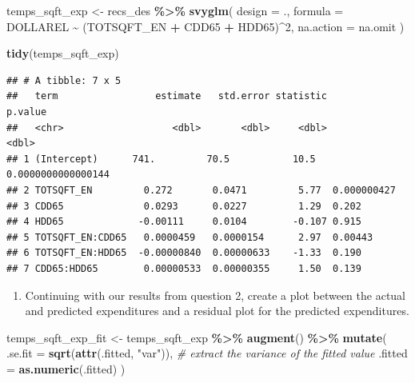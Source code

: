 \documentclass[
]{krantz}
\makeatletter
\newenvironment{Shaded}{\begin{snugshade}}{\end{snugshade}}
\newcommand{\AttributeTok}[1]{\textcolor[rgb]{0.27,0.27,0.27}{#1}}
\newcommand{\CommentTok}[1]{\textcolor[rgb]{0.37,0.37,0.37}{\textit{#1}}}
\newcommand{\DecValTok}[1]{\textcolor[rgb]{0.06,0.06,0.06}{#1}}
\newcommand{\FunctionTok}[1]{\textcolor[rgb]{0.27,0.27,0.27}{\textbf{#1}}}
\newcommand{\NormalTok}[1]{#1}
\newcommand{\OtherTok}[1]{\textcolor[rgb]{0.37,0.37,0.37}{#1}}
\newcommand{\SpecialCharTok}[1]{\textcolor[rgb]{0.43,0.43,0.43}{\textbf{#1}}}
\newcommand{\StringTok}[1]{\textcolor[rgb]{0.5,0.5,0.5}{#1}}
\providecommand{\tightlist}{%
  \setlength{\itemsep}{0pt}\setlength{\parskip}{0pt}}
\newenvironment{kframe}{%
\medskip{}
\setlength{\fboxsep}{.8em}
 \def\at@end@of@kframe{}%
 \ifinner\ifhmode%
  \def\at@end@of@kframe{\end{minipage}}%
  \begin{minipage}{\columnwidth}%
 \fi\fi%
 \def\FrameCommand##1{\hskip\@totalleftmargin \hskip-\fboxsep
 \colorbox{shadecolor}{##1}\hskip-\fboxsep
     \hskip-\linewidth \hskip-\@totalleftmargin \hskip\columnwidth}%
 \MakeFramed {\advance\hsize-\width
   \@totalleftmargin\z@ \linewidth\hsize
   \@setminipage}}%
 {\par\unskip\endMakeFramed%
 \at@end@of@kframe}
\renewenvironment{Shaded}{\begin{kframe}}{\end{kframe}}
\makeatother
\begin{document}
\begin{Shaded}
\begin{Highlighting}[]
\NormalTok{temps\_sqft\_exp }\OtherTok{\textless{}{-}}\NormalTok{ recs\_des }\SpecialCharTok{\%\textgreater{}\%}
  \FunctionTok{svyglm}\NormalTok{(}
    \AttributeTok{design =}\NormalTok{ .,}
    \AttributeTok{formula =}\NormalTok{ DOLLAREL }\SpecialCharTok{\textasciitilde{}}\NormalTok{ (TOTSQFT\_EN }\SpecialCharTok{+}\NormalTok{ CDD65 }\SpecialCharTok{+}\NormalTok{ HDD65)}\SpecialCharTok{\^{}}\DecValTok{2}\NormalTok{,}
    \AttributeTok{na.action =}\NormalTok{ na.omit}
\NormalTok{  )}

\FunctionTok{tidy}\NormalTok{(temps\_sqft\_exp)}
\end{Highlighting}
\end{Shaded}

\begin{verbatim}
## # A tibble: 7 x 5
##   term                 estimate   std.error statistic            p.value
##   <chr>                   <dbl>       <dbl>     <dbl>              <dbl>
## 1 (Intercept)      741.         70.5           10.5   0.0000000000000144
## 2 TOTSQFT_EN         0.272       0.0471         5.77  0.000000427       
## 3 CDD65              0.0293      0.0227         1.29  0.202             
## 4 HDD65             -0.00111     0.0104        -0.107 0.915             
## 5 TOTSQFT_EN:CDD65   0.0000459   0.0000154      2.97  0.00443           
## 6 TOTSQFT_EN:HDD65  -0.00000840  0.00000633    -1.33  0.190             
## 7 CDD65:HDD65        0.00000533  0.00000355     1.50  0.139
\end{verbatim}

\begin{enumerate}
\def\labelenumi{\arabic{enumi}.}
\setcounter{enumi}{2}
\tightlist
\item
  Continuing with our results from question 2, create a plot between the actual and predicted expenditures and a residual plot for the predicted expenditures.
\end{enumerate}

\begin{Shaded}
\begin{Highlighting}[]
\NormalTok{temps\_sqft\_exp\_fit }\OtherTok{\textless{}{-}}\NormalTok{ temps\_sqft\_exp }\SpecialCharTok{\%\textgreater{}\%}
  \FunctionTok{augment}\NormalTok{() }\SpecialCharTok{\%\textgreater{}\%}
  \FunctionTok{mutate}\NormalTok{(}
    \AttributeTok{.se.fit =} \FunctionTok{sqrt}\NormalTok{(}\FunctionTok{attr}\NormalTok{(.fitted, }\StringTok{"var"}\NormalTok{)),}
    \CommentTok{\# extract the variance of the fitted value}
    \AttributeTok{.fitted =} \FunctionTok{as.numeric}\NormalTok{(.fitted)}
\NormalTok{  )}
\end{Highlighting}
\end{Shaded}
\end{document}
